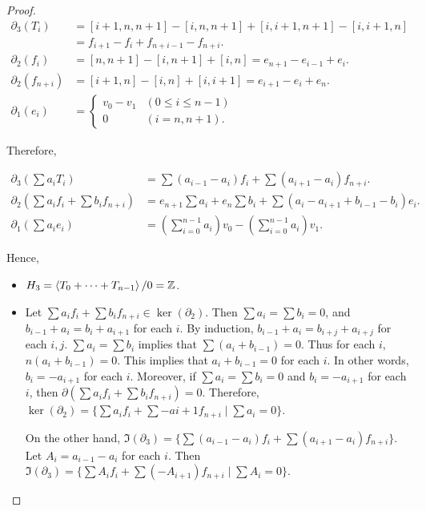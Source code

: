 \documentclass[12pt, psamsfonts]{amsart}
\theoremstyle{definition}
\theoremstyle{remark}
\numberwithin{equation}{section}
\begin{document}
\begin{proof}
  \begin{align*}
    \partial_3(T_i)
      &= [i + 1, n, n + 1] - [i, n, n + 1] + [i, i + 1, n + 1] - [i, i + 1, n] \\
      &= f_{i + 1} - f_i + f_{n + i - 1} - f_{n + i}. \\
    \partial_2(f_i)
      &= [n, n + 1] - [i, n + 1] + [i, n] = e_{n + 1} - e_{i - 1} + e_i. \\
    \partial_2(f_{n + i})
      &= [i + 1, n] - [i, n] + [i, i + 1] = e_{i + 1} - e_{i} + e_n. \\
    \partial_1(e_i) &= \begin{cases}
      v_0 - v_1 & (0 \leq i \leq n - 1) \\
      0 & (i = n, n + 1).
    \end{cases} 
  \end{align*}

  Therefore,

  \begin{align*}
    \partial_3(\sum a_iT_i) &= \sum (a_{i - 1} - a_i)f_i + \sum (a_{i + 1} - a_i) f_{n + i}. \\
    \partial_2(\sum a_if_i + \sum b_if_{n + i}) &= e_{n + 1}\sum a_i + e_n\sum b_i + \sum (a_i - a_{i + 1} + b_{i - 1} - b_i) e_i.\\
    \partial_1(\sum a_i e_i) &= (\sum_{i=0}^{n-1} a_i) v_0 - (\sum_{i=0}^{n-1} a_i) v_1.
  \end{align*}

  Hence,

  \begin{itemize}
    \item
      $H_3 = \ev{ T_0 + \cdots + T_{n - 1} } / 0 = \mathbb{Z}$.
    \item
      Let $\sum a_if_i + \sum b_if_{n + i} \in \ker(\partial_2)$.
      Then $\sum a_i = \sum b_i = 0$, and $b_{i - 1} + a_i = b_i + a_{i + 1}$ for each $i$.
      By induction, $b_{i - 1} + a_i = b_{i + j} + a_{i + j}$ for each $i, j$.
      $\sum a_i = \sum b_i$ implies that $\sum (a_i + b_{i - 1}) = 0$.
      Thus for each $i$, $n(a_i + b_{i - 1}) = 0$.
      This implies that $a_i + b_{i - 1} = 0$ for each $i$.
      In other words, $b_i = -a_{i + 1}$ for each $i$.
      Moreover, if $\sum a_i = \sum b_i = 0$ and $b_i = -a_{i + 1}$ for each $i$, then $\partial(\sum a_if_i + \sum b_if_{n + i}) = 0$.
      Therefore, $\ker(\partial_2) = \{ \sum a_if_i + \sum -a{i + 1}f_{n + i} \mid \sum a_i = 0 \}$.

      On the other hand, $\Im(\partial_3) = \{ \sum (a_{i - 1} - a_i) f_i + \sum (a_{i + 1} - a_i) f_{n + i} \}$.
      Let $A_i = a_{i - 1} - a_i$ for each $i$.
      Then $\Im(\partial_3) = \{ \sum A_if_i + \sum (-A_{i + 1})f_{n + i} \mid \sum A_i = 0 \}$.


\end{itemize}
\end{proof}
\end{document}

